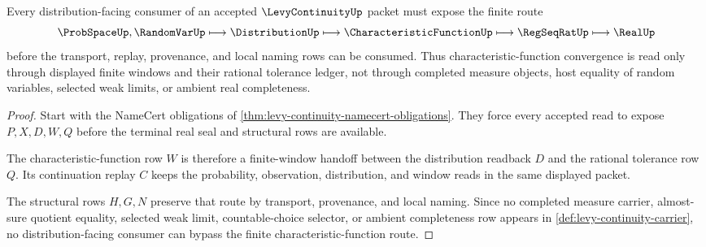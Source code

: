 \begin{theorem}
\label{thm:levy-continuity-characteristic-function-route}
Every distribution-facing consumer of an accepted $\LevyContinuityUp$ packet must expose the finite route
$$
\ProbSpaceUp,\RandomVarUp \longmapsto \DistributionUp \longmapsto \CharacteristicFunctionUp \longmapsto \RegSeqRatUp \longmapsto \RealUp
$$
before the transport, replay, provenance, and local naming rows can be consumed. Thus characteristic-function convergence is read only through displayed finite windows and their rational tolerance ledger, not through completed measure objects, host equality of random variables, selected weak limits, or ambient real completeness.
\end{theorem}
\begin{proof}
Start with the NameCert obligations of \autoref{thm:levy-continuity-namecert-obligations}. They force every accepted read to expose $P,X,D,W,Q$ before the terminal real seal and structural rows are available.

The characteristic-function row $W$ is therefore a finite-window handoff between the distribution readback $D$ and the rational tolerance row $Q$. Its continuation replay $C$ keeps the probability, observation, distribution, and window reads in the same displayed packet.

The structural rows $H,G,N$ preserve that route by transport, provenance, and local naming. Since no completed measure carrier, almost-sure quotient equality, selected weak limit, countable-choice selector, or ambient completeness row appears in \autoref{def:levy-continuity-carrier}, no distribution-facing consumer can bypass the finite characteristic-function route.
\end{proof}



